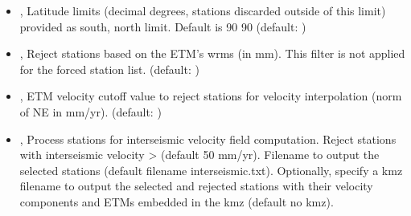 \documentclass[letterpaper,10pt,english]{sphinxmanual}
\begin{document}
\begin{itemize}
\item {} 
\sphinxAtStartPar
{\hyperref[\detokenize{pgamit.com:TrajectoryFit.py--lat_lim}]{}} , {\hyperref[\detokenize{pgamit.com:TrajectoryFit.py---latitude_limits}]{}}  \sphinxhyphen{} Latitude limits (decimal degrees, stations discarded outside of this limit) provided as south, north limit. Default is \sphinxhyphen{}90 90 (default: \sphinxcode{\sphinxupquote{{[}\sphinxhyphen{}90, 90{]}}})

\item {} 
\sphinxAtStartPar
{\hyperref[\detokenize{pgamit.com:TrajectoryFit.py--sigma}]{}} , {\hyperref[\detokenize{pgamit.com:TrajectoryFit.py---sigma_cutoff}]{}}  \sphinxhyphen{} Reject stations based on the ETM’s wrms (in mm). This filter is not applied for the forced station list. (default: \sphinxcode{\sphinxupquote{{[}2.5{]}}})

\item {} 
\sphinxAtStartPar
{\hyperref[\detokenize{pgamit.com:TrajectoryFit.py--vel}]{}} , {\hyperref[\detokenize{pgamit.com:TrajectoryFit.py---velocity_cutoff}]{}}  \sphinxhyphen{} ETM velocity cutoff value to reject stations for velocity interpolation (norm of NE in mm/yr). (default: \sphinxcode{\sphinxupquote{{[}50{]}}})

\item {} 
\sphinxAtStartPar
{\hyperref[\detokenize{pgamit.com:TrajectoryFit.py--interseismic}]{}} , {\hyperref[\detokenize{pgamit.com:TrajectoryFit.py---interseismic_process}]{}}  \sphinxhyphen{} Process stations for interseismic velocity field computation. Reject stations with interseismic velocity \textgreater{}  (default 50 mm/yr). Filename to output the selected stations (default filename interseismic.txt). Optionally, specify a kmz filename to output the selected and rejected stations with their velocity components and ETMs embedded in the kmz (default no kmz).


\end{itemize}
\end{document}
